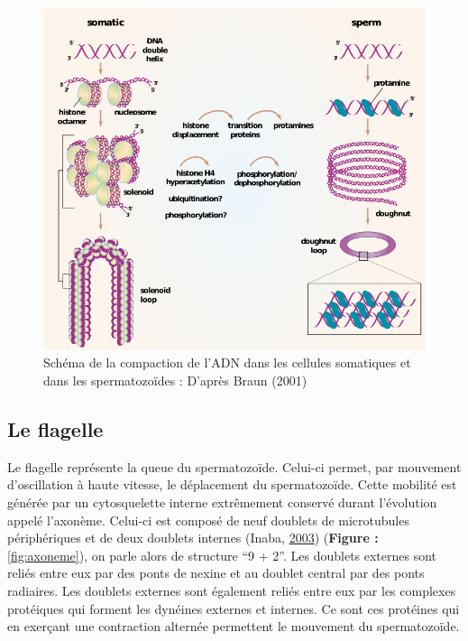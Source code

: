 \documentclass[12pt,twoside]{reedthesis}
\theoremstyle{definition}
\theoremstyle{definition}
\theoremstyle{remark}
\begin{document}
  \newpage
  
  \begin{figure}
  
  {\centering \includegraphics[scale=.55]{figure/noyau} 
  
  }
  
  \caption[Schéma de la compaction de l’ADN dans les cellules somatiques et dans les spermatozoïdes]{Schéma de la compaction de l’ADN dans les cellules somatiques et dans les spermatozoïdes : D'après Braun (2001)}\label{fig:noyau}
  \end{figure}
  
  \newpage
  
  \subsection{Le flagelle}\label{le-flagelle}
  
  Le flagelle représente la queue du spermatozoïde. Celui-ci permet, par
  mouvement d'oscillation à haute vitesse, le déplacement du
  spermatozoïde. Cette mobilité est générée par un cytosquelette interne
  extrêmement conservé durant l'évolution appelé l'axonème. Celui-ci est
  composé de neuf doublets de microtubules périphériques et de deux
  doublets internes (Inaba, \protect\hyperlink{ref-Inaba2003}{2003})
  (\textbf{Figure : }\ref{fig:axoneme}), on parle alors de structure ``9 +
  2''. Les doublets externes sont reliés entre eux par des ponts de nexine
  et au doublet central par des ponts radiaires. Les doublets externes
  sont également reliés entre eux par les complexes protéiques qui forment
  les dynéines externes et internes. Ce sont ces protéines qui en exerçant
  une contraction alternée permettent le mouvement du spermatozoïde.
  
\end{document}

